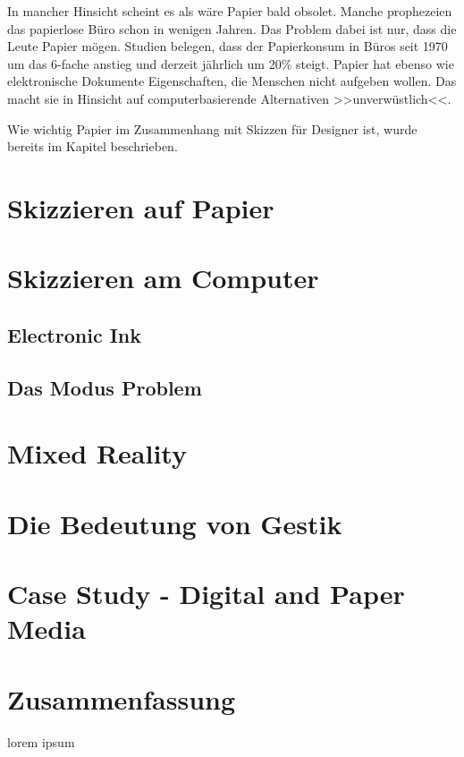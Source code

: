 \medskip In mancher Hinsicht scheint es als wäre Papier bald obsolet. Manche prophezeien das papierlose Büro schon in wenigen Jahren. Das Problem dabei ist nur, dass die Leute Papier mögen. Studien belegen, dass der Papierkonsum in Büros seit 1970 um das 6-fache anstieg und derzeit jährlich um 20\% steigt. \citep{seybold:1992} Papier hat ebenso wie elektronische Dokumente Eigenschaften, die Menschen nicht aufgeben wollen. Das macht sie in Hinsicht auf computerbasierende Alternativen >>unverwüstlich<<. \citep{Luff:1992}

Wie wichtig Papier im Zusammenhang mit Skizzen für Designer ist, wurde bereits im Kapitel  beschrieben.


\section{Skizzieren auf Papier}

\section{Skizzieren am Computer}

\subsection{Electronic Ink}

\subsection{Das Modus Problem}\label{sec:ModusProblem}

\section{Mixed Reality}

\section{Die Bedeutung von Gestik}

\section{Case Study - Digital and Paper Media}

\section*{Zusammenfassung}
lorem ipsum